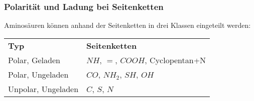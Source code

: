 \subsubsection{Polarität und Ladung bei Seitenketten}

Aminosäuren können anhand der Seitenketten in drei Klassen eingeteilt werden:

\begin{center}
	\begin{tabular}{l l}
		\textbf{Typ} & \textbf{Seitenketten} \\
		Polar, Geladen & $NH$, $=$, $COOH$, Cyclopentan+N \\
		Polar, Ungeladen & $CO$, $NH_2$, $SH$, $OH$ \\
		Unpolar, Ungeladen & $C$, $S$, $N$
	\end{tabular}
\end{center}

